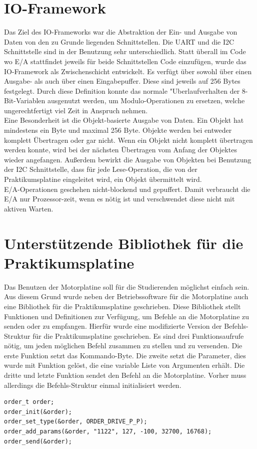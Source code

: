 \section{IO-Framework}
Das Ziel des IO-Frameworks war die Abstraktion der Ein- und Ausgabe von Daten von den zu Grunde liegenden Schnittstellen.
Die UART und die I2C Schnittstelle sind in der Benutzung sehr unterschiedlich. Statt überall im Code wo E/A stattfindet
jeweils für beide Schnittstellen Code einzufügen, wurde das IO-Framework als Zwischenschicht entwickelt. Es verfügt über sowohl
über einen Ausgabe- als auch über einen Eingabepuffer. Diese sind jeweils auf 256 Bytes festgelegt. Durch diese Definition
konnte das normale "Uberlaufverhalten der 8-Bit-Variablen ausgenutzt werden, um Modulo-Operationen zu ersetzen, welche
ungerechtfertigt viel Zeit in Anspruch nehmen.\\
Eine Besonderheit ist die Objekt-basierte Ausgabe von Daten. Ein Objekt hat mindestens ein Byte und maximal 256 Byte. Objekte
werden bei entweder komplett Übertragen oder gar nicht. Wenn ein Objekt nicht komplett übertragen werden konnte, wird bei der
nächsten Übertragen vom Anfang der Objektes wieder angefangen. Außerdem bewirkt die Ausgabe von Objekten bei Benutzung der I2C 
Schnittstelle, dass für jede Lese-Operation, die von der Praktikumsplatine eingeleitet wird, ein Objekt übermittelt wird.\\
E/A-Operationen geschehen nicht-blockend und gepuffert. Damit verbraucht die E/A nur Prozessor-zeit, wenn es nötig ist und
verschwendet diese nicht mit aktiven Warten.

\section{Unterstützende Bibliothek für die Praktikumsplatine}
Das Benutzen der Motorplatine soll für die Studierenden möglichst einfach sein.
Aus diesem Grund wurde neben der Betriebssoftware für die Motorplatine auch eine
Bibliothek für die Praktikumsplatine geschrieben. Diese Bibliothek stellt
Funktionen und Definitionen zur Verfügung, um Befehle an die Motorplatine zu
senden oder zu empfangen. Hierfür wurde eine modifizierte Version der
Befehls-Struktur für die Praktikumsplatine geschrieben. Es sind drei Funktionsaufrufe
nötig, um jeden möglichen Befehl zusammen zu stellen und zu versenden. Die erste
Funktion setzt das Kommando-Byte. Die zweite setzt die Parameter, dies wurde
mit Funktion gelöst, die eine variable Liste von Argumenten erhält. Die dritte und
letzte Funktion sendet den Befehl an die Motorplatine. Vorher muss allerdings die
Befehls-Struktur einmal initialisiert werden.
\begin{verbatim}
order_t order;
order_init(&order);
order_set_type(&order, ORDER_DRIVE_P_P);
order_add_params(&order, "1122", 127, -100, 32700, 16768);
order_send(&order);
\end{verbatim}

